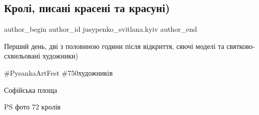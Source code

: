  
 
 
 
 
 
\subsection{Кролі, писані красені та красуні)}
\label{sec:05_04_2018.fb.jusypenko_svitlana.kyiv.1.kroli_pysani_kraseni_ta_krasuni}
 
\ifcmt
 author_begin
   author_id jusypenko_svitlana.kyiv
 author_end
\fi

Перший день, дві з половиною години після відкриття, сяючі моделі та
святково-схвильовані художники) 

\#PysankaArtFest \#750художників 

Софійська площа

PS фото 72 кролів





